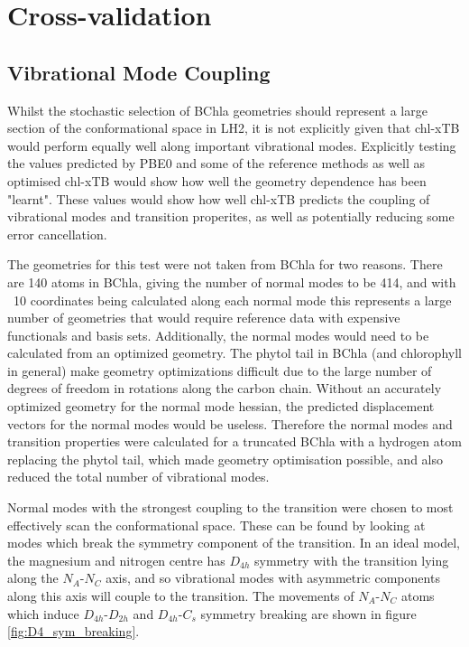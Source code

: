 \afterpartskip
\section{Cross-validation}
\label{sec:chl_benchmarking}

\subsection{Vibrational Mode Coupling}
\label{subsec:pot_energy_surfaces}

Whilst the stochastic selection of BChla geometries should represent a large section 
of the conformational space in LH2, it is not explicitly given that chl-xTB would
perform equally well along important vibrational modes. Explicitly testing the
values predicted by PBE0 and some of the reference methods as well as optimised
chl-xTB would show how well the geometry dependence has been "learnt". These values
would show how well chl-xTB predicts the coupling of vibrational modes and transition 
properites, as well as potentially reducing some error cancellation.

The geometries for this test were not taken from BChla for two reasons. There are
140 atoms in BChla, giving the number of normal modes to be 414, and with ~10 coordinates
being calculated along each normal mode this represents a large number of geometries
that would require reference data with expensive functionals and basis sets. Additionally,
the normal modes would need to be calculated from an optimized geometry. The phytol
tail in BChla (and chlorophyll in general) make geometry optimizations difficult
due to the large number of degrees of freedom in rotations along the carbon chain. 
Without an accurately optimized geometry for the normal mode hessian, the predicted 
displacement vectors for the normal modes would be useless. Therefore the normal
modes and transition properties were calculated for a truncated BChla with a hydrogen
atom replacing the phytol tail, which made geometry optimisation possible, and also
reduced the total number of vibrational modes.

Normal modes with the strongest coupling to the \Qy transition were chosen to most
effectively scan the conformational space. These can be found by looking at modes
which break the symmetry component of the \Qy transition. In an ideal model, the 
magnesium and nitrogen centre has $D_{4h}$ symmetry with the \Qy transition lying 
along the $N_A$-$N_C$ axis, and so vibrational modes with asymmetric components 
along this axis will couple to the transition. The movements of $N_A$-$N_C$ atoms 
which induce $D_{4h}$-$D_{2h}$ and $D_{4h}$-$C_{s}$ symmetry breaking are shown
in figure \ref{fig:D4_sym_breaking}.

